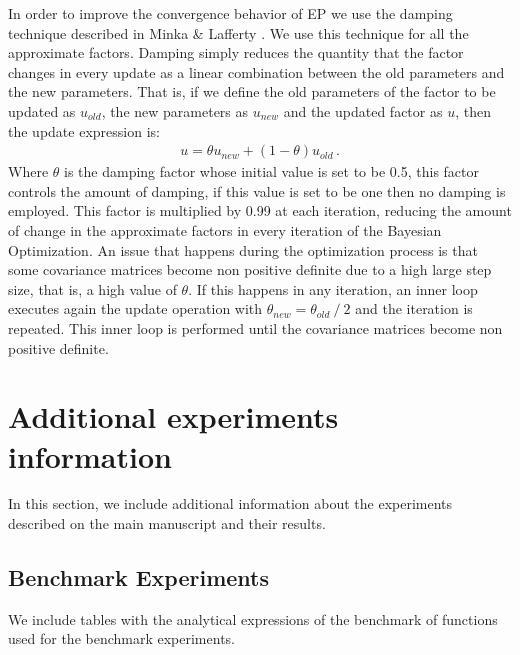 In order to improve the convergence behavior of EP we use the damping technique described in Minka \& Lafferty \cite{minka2012expectation}. We use this technique for all the approximate factors. Damping simply reduces the quantity that the factor changes in every update as a linear combination between the old parameters and the new parameters. That is, if we define the old parameters of the factor to be updated as $u_{old}$, the new parameters as $u_{new}$ and the updated factor as $u$, then the update expression is:
\begin{align}
    u = \theta u_{new} + (1-\theta)u_{old}\,.
\end{align}
Where $\theta$ is the damping factor whose initial value is set to be 0.5, this factor controls the amount of damping, if this value is set to be one then no damping is employed. This factor is multiplied by 0.99 at each iteration, reducing the amount of change in the approximate factors in every iteration of the Bayesian Optimization. An issue that happens during the optimization process is that some covariance matrices become non positive definite due to a high large step size, that is, a high value of $\theta$. If this happens in any iteration, an inner loop executes again the update operation with $\theta_{new} = \theta_{old}\ /\ 2$ and the iteration is repeated. This inner loop is performed until the covariance matrices become non positive definite.

\section{Additional experiments information}
In this section, we include additional information about the experiments described on the main manuscript and their results.

\subsection{Benchmark Experiments}
We include tables with the analytical expressions of the benchmark of functions used for the benchmark experiments. 


